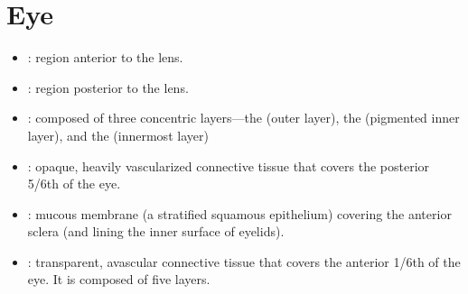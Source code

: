 \section{Eye}
\begin{center}
\end{center}
\begin{multicols}{2}
\begin{itemize}
  \item {}: region anterior to the lens. 
  
  \begin{center}
  \end{center}
  
  \item {}: region posterior to the lens. 
  
  \begin{center}
  \end{center}
  
  \item {}: composed of three concentric layers---the  (outer layer), the  (pigmented inner layer), and the  (innermost layer)
  
  \begin{center}
  \end{center}
  
  \item {}:  opaque, heavily vascularized connective tissue that covers the posterior 5/6th of the eye. 
  
  \begin{center}
  \end{center}
  
  \item {}: mucous membrane (a stratified squamous epithelium) covering the anterior sclera (and lining the inner surface of eyelids).
  
  \begin{center}
  \end{center}
  
  \item {}: transparent, avascular connective tissue that covers the anterior 1/6th of the eye. It is composed of five layers.
  

\end{itemize}
\end{multicols}
